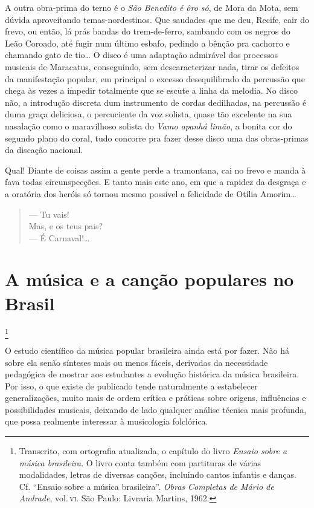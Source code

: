 A outra obra-prima do terno é o \textit{São Benedito é ôro só}, de Mora da
Mota, sem dúvida aproveitando temas-nordestinos. Que saudades que me
deu, Recife, cair do frevo, ou então, lá prás bandas do trem-de-ferro,
sambando com os negros do Leão Coroado, até fugir num último esbafo,
pedindo a bênção pra cachorro e chamando gato de tio\ldots{} O disco é uma
adaptação admirável dos processos musicais de Maracatus, conseguindo,
sem descaracterizar nada, tirar os defeitos da manifestação popular, em
principal o excesso desequilibrado da percussão que chega às vezes a
impedir totalmente que se escute a linha da melodia. No disco não, a
introdução discreta dum instrumento de cordas dedilhadas, na percussão é
duma graça deliciosa, o percuciente da voz solista, quase tão excelente
na sua nasalação como o maravilhoso solista do \textit{Vamo apanhá limão},
a bonita cor do segundo plano do coral, tudo concorre pra fazer desse
disco uma das obras-primas da discação nacional.

Qual! Diante de coisas assim a gente perde a tramontana, cai no frevo e
manda à fava todas circunspecções. E tanto mais este ano, em que a
rapidez da desgraça e a oratória dos heróis só tornou mesmo possível a
felicidade de Otília Amorim\ldots{}

\begin{verse}
--- Tu vais!\\
Mas, e os teus pais?\\
--- É Carnaval!\ldots{}
\end{verse}


\chapter{A música e a canção populares no Brasil}\footnote{Transcrito, com ortografia atualizada, o capítulo do livro \textit{Ensaio sobre a música brasileira}. O livro conta também com partituras de várias modalidades, letras de diversas canções, incluindo cantos infantis e danças. Cf. ``Ensaio sobre a música brasileira''. \textit{Obras Completas de Mário de Andrade}, vol.\,\textsc{vi}. São Paulo: Livraria Martins, 1962.}

O estudo científico da música popular brasileira ainda está por fazer.
Não há sobre ela senão sínteses mais ou menos fáceis, derivadas da
necessidade pedagógica de mostrar aos estudantes a evolução histórica da
música brasileira. Por isso, o que existe de publicado tende
naturalmente a estabelecer generalizações, muito mais de ordem crítica e
práticas sobre origens, influências e possibilidades musicais, deixando
de lado qualquer análise técnica mais profunda, que possa realmente
interessar à musicologia folclórica.

